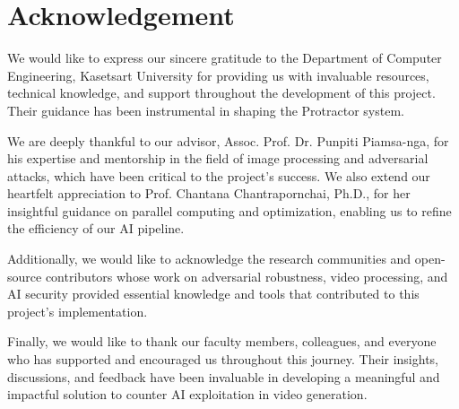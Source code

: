 \chapter*{Acknowledgement}
\label{chap:acknowledgement}

We would like to express our sincere gratitude to the Department of Computer Engineering, Kasetsart University for providing us with invaluable resources, technical knowledge, and support throughout the development of this project. Their guidance has been instrumental in shaping the Protractor system.

We are deeply thankful to our advisor, Assoc. Prof. Dr. Punpiti Piamsa-nga, for his expertise and mentorship in the field of image processing and adversarial attacks, which have been critical to the project's success. We also extend our heartfelt appreciation to Prof. Chantana Chantrapornchai, Ph.D., for her insightful guidance on parallel computing and optimization, enabling us to refine the efficiency of our AI pipeline.

Additionally, we would like to acknowledge the research communities and open-source contributors whose work on adversarial robustness, video processing, and AI security provided essential knowledge and tools that contributed to this project’s implementation.

Finally, we would like to thank our faculty members, colleagues, and everyone who has supported and encouraged us throughout this journey. Their insights, discussions, and feedback have been invaluable in developing a meaningful and impactful solution to counter AI exploitation in video generation.


\vspace{.2in}
\begin{flushright}
    \usevar{\srsAuthorOne} \\
    \usevar{\srsAuthorTwo} \\
\end{flushright}